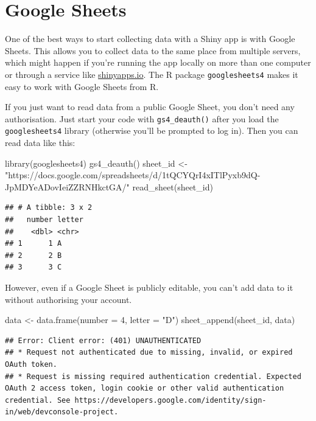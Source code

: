 \documentclass[
]{book}
\newenvironment{Shaded}{\begin{snugshade}}{\end{snugshade}}
\newcommand{\AttributeTok}[1]{\textcolor[rgb]{0.77,0.63,0.00}{#1}}
\newcommand{\DecValTok}[1]{\textcolor[rgb]{0.00,0.00,0.81}{#1}}
\newcommand{\FunctionTok}[1]{\textcolor[rgb]{0.00,0.00,0.00}{#1}}
\newcommand{\NormalTok}[1]{#1}
\newcommand{\OtherTok}[1]{\textcolor[rgb]{0.56,0.35,0.01}{#1}}
\newcommand{\StringTok}[1]{\textcolor[rgb]{0.31,0.60,0.02}{#1}}
\begin{document}
\hypertarget{google_sheets}{%
\section{Google Sheets}\label{google_sheets}}

One of the best ways to start collecting data with a Shiny app is with Google Sheets. This allows you to collect data to the same place from multiple servers, which might happen if you're running the app locally on more than one computer or through a service like \href{https://shinyapps.io}{shinyapps.io}. The R package \texttt{googlesheets4} makes it easy to work with Google Sheets from R.

If you just want to read data from a public Google Sheet, you don't need any authorisation. Just start your code with \texttt{gs4\_deauth()} after you load the \texttt{googlesheets4} library (otherwise you'll be prompted to log in). Then you can read data like this:

\begin{Shaded}
\begin{Highlighting}[]
\FunctionTok{library}\NormalTok{(googlesheets4)}
\FunctionTok{gs4\_deauth}\NormalTok{()}
\NormalTok{sheet\_id }\OtherTok{\textless{}{-}} \StringTok{"https://docs.google.com/spreadsheets/d/1tQCYQrI4xITlPyxb9dQ{-}JpMDYeADovIeiZZRNHkctGA/"}
\FunctionTok{read\_sheet}\NormalTok{(sheet\_id)}
\end{Highlighting}
\end{Shaded}

\begin{verbatim}
## # A tibble: 3 x 2
##   number letter
##    <dbl> <chr> 
## 1      1 A     
## 2      2 B     
## 3      3 C
\end{verbatim}

However, even if a Google Sheet is publicly editable, you can't add data to it without authorising your account.

\begin{Shaded}
\begin{Highlighting}[]
\NormalTok{data }\OtherTok{\textless{}{-}} \FunctionTok{data.frame}\NormalTok{(}\AttributeTok{number =} \DecValTok{4}\NormalTok{, }\AttributeTok{letter =} \StringTok{"D"}\NormalTok{)}
\FunctionTok{sheet\_append}\NormalTok{(sheet\_id, data)}
\end{Highlighting}
\end{Shaded}

\begin{verbatim}
## Error: Client error: (401) UNAUTHENTICATED
## * Request not authenticated due to missing, invalid, or expired OAuth token.
## * Request is missing required authentication credential. Expected OAuth 2 access token, login cookie or other valid authentication credential. See https://developers.google.com/identity/sign-in/web/devconsole-project.
\end{verbatim}
\end{document}
